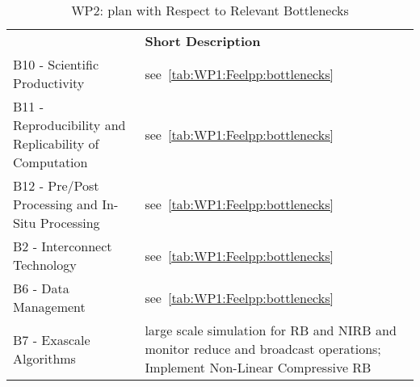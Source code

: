 \begin{table}[!ht]
    \centering
    {
        \setlength{\parindent}{0pt}
        \def\arraystretch{1.25}
        {
            \fontsize{9}{11}\selectfont
            \begin{tabular}{!{\color{numpexgray}\vrule}p{.25\linewidth}!{\color{numpexgray}\vrule}p{.6885\linewidth}!{\color{numpexgray}\vrule}}

     &  {\rule{0pt}{2.5ex}\color{white}\bf Short Description }\\

    B10 - Scientific Productivity & see~\cref{tab:WP1:Feelpp:bottlenecks} \\
    B11 - Reproducibility and Replicability of Computation &  see~\cref{tab:WP1:Feelpp:bottlenecks} \\
    B12 - Pre/Post Processing and In-Situ Processing &  see~\cref{tab:WP1:Feelpp:bottlenecks} \\
    B2 - Interconnect Technology &  see~\cref{tab:WP1:Feelpp:bottlenecks} \\
    B6 - Data Management &  see~\cref{tab:WP1:Feelpp:bottlenecks} \\
    B7 - Exascale Algorithms & large scale simulation for \ac{RB} and \ac{NIRB} and monitor reduce and broadcast operations; Implement Non-Linear Compressive RB  \\
\hline
\end{tabular}
        }
    }
    \caption{WP2: \Feelpp plan with Respect to Relevant Bottlenecks}
    \label{tab:WP2:Feelpp:bottlenecks}
\end{table}